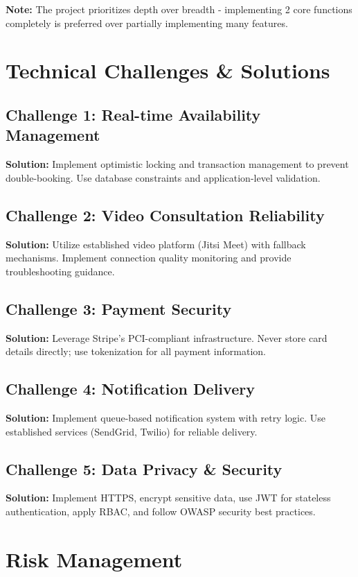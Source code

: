 \documentclass[11pt,a4paper]{article}
\begin{document}
\textbf{Note:} The project prioritizes depth over breadth - implementing 2 core functions completely is preferred over partially implementing many features.

\section{Technical Challenges \& Solutions}

\subsection*{Challenge 1: Real-time Availability Management}
\textbf{Solution:} Implement optimistic locking and transaction management to prevent double-booking. Use database constraints and application-level validation.

\subsection*{Challenge 2: Video Consultation Reliability}
\textbf{Solution:} Utilize established video platform (Jitsi Meet) with fallback mechanisms. Implement connection quality monitoring and provide troubleshooting guidance.

\subsection*{Challenge 3: Payment Security}
\textbf{Solution:} Leverage Stripe's PCI-compliant infrastructure. Never store card details directly; use tokenization for all payment information.

\subsection*{Challenge 4: Notification Delivery}
\textbf{Solution:} Implement queue-based notification system with retry logic. Use established services (SendGrid, Twilio) for reliable delivery.

\subsection*{Challenge 5: Data Privacy \& Security}
\textbf{Solution:} Implement HTTPS, encrypt sensitive data, use JWT for stateless authentication, apply RBAC, and follow OWASP security best practices.

\section{Risk Management}
\end{document}
